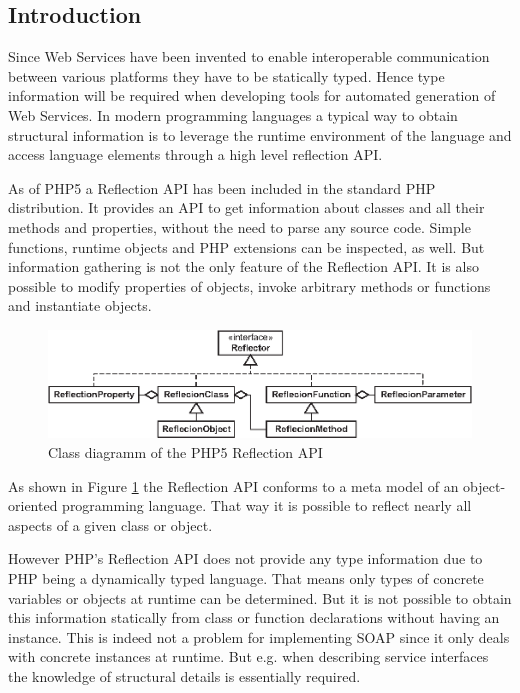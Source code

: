 \documentclass[10pt,final,a4paper,oneside]{article}
\begin{document}
\subsection{Introduction}
Since Web Services have been invented
to enable interoperable communication between
various platforms they have to be statically typed.
Hence type information will be required when
developing tools for automated generation of Web Services.
In modern programming languages
a typical way to obtain structural information
is to leverage the runtime environment of the language
and access language elements through a high level reflection API.

As of PHP5 a Reflection API has been included
in the standard PHP distribution.
It provides an API to get information about classes
and all their methods and properties,
without the need to parse any source code.
Simple functions, runtime objects and PHP extensions
can be inspected, as well.
But information gathering is not the
only feature of the Reflection API.
It is also possible to modify properties of objects,
invoke arbitrary methods or functions and
instantiate objects.

\begin{figure}[htbp]
	\centering
		\includegraphics[width=1.00\textwidth]{figures/php5-reflection-api.eps}
	\caption{Class diagramm of the  PHP5 Reflection API}
	\label{fig:php5-reflection-api}
\end{figure}

As shown in Figure \ref{fig:php5-reflection-api}
the Reflection API conforms to a meta model
of an object-oriented programming language.
That way it is possible to reflect
nearly all aspects of a given class or object.

However PHP's Reflection API does not provide any type information
due to PHP being a dynamically typed language.
That means only types of concrete variables or objects
at runtime can be determined.
But it is not possible to obtain this information statically from
class or function declarations without having an instance.
This is indeed not a problem for implementing SOAP
since it only deals with concrete instances at runtime.
But e.g. when describing service interfaces
the knowledge of structural details is essentially required.
\end{document}
